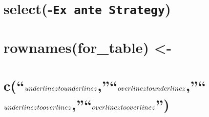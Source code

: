 \documentclass[
]{article}
\begin{document}
\hypertarget{select-ex-ante-strategy}{%
\section{\texorpdfstring{select(-\texttt{Ex\ ante\ Strategy})}{select(-Ex ante Strategy)}}\label{select-ex-ante-strategy}}

\hypertarget{section}{%
\section{}\label{section}}

\hypertarget{rownamesfor_table--}{%
\section{rownames(for\_table) \textless-}\label{rownamesfor_table--}}

\hypertarget{cunderlineztounderlinezoverlineztounderlinezunderlineztooverlinezoverlineztooverlinez}{%
\section{\texorpdfstring{c(``\(\\underline{z}\\to\\underline{z}\),''``\(\\overline{z}\\to\\underline{z}\),''``\(\\underline{z}\\to\\overline{z}\),''``\(\\overline{z}\\to\\overline{z}\)'')}{c(``\textbackslash\textbackslash underline\{z\}\textbackslash\textbackslash to\textbackslash\textbackslash underline\{z\},''\,``\textbackslash\textbackslash overline\{z\}\textbackslash\textbackslash to\textbackslash\textbackslash underline\{z\},''\,``\textbackslash\textbackslash underline\{z\}\textbackslash\textbackslash to\textbackslash\textbackslash overline\{z\},''\,``\textbackslash\textbackslash overline\{z\}\textbackslash\textbackslash to\textbackslash\textbackslash overline\{z\}'')}}\label{cunderlineztounderlinezoverlineztounderlinezunderlineztooverlinezoverlineztooverlinez}}

\hypertarget{section-1}{%
\section{}\label{section-1}}
\end{document}
